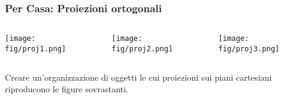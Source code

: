 \documentclass{beamer}
\newcommand{\fig}{figures}
\begin{document}
\begin{frame}
\frametitle{Per Casa: Proiezioni ortogonali}
\begin{columns}
\begin{column}{0.32\textwidth}
\texttt{[image: \\fig/proj1.png]}
\end{column}
\begin{column}{0.32\textwidth}
\texttt{[image: \\fig/proj2.png]}
\end{column}
\begin{column}{0.32\textwidth}
\texttt{[image: \\fig/proj3.png]}
\end{column}
\end{columns}
\vspace{20pt}
Creare un'organizzazione di oggetti le cui proiezioni sui piani cartesiani riproducono le figure sovrastanti.
\end{frame}
\end{document}
